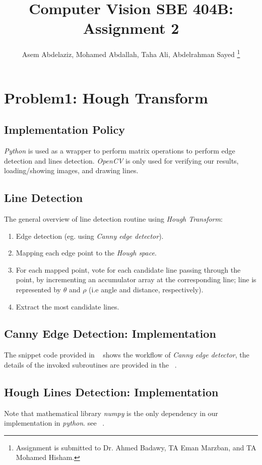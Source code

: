 \documentclass[letterpaper, 12 pt, conference ,onecolumn]{ieeeconf}  %
\title{
Computer Vision SBE 404B: Assignment 2
}
\author{
 Asem Abdelaziz,
 Mohamed Abdallah, 
 Taha Ali,
 Abdelrahman Sayed  
 \thanks{Assignment is submitted to Dr. Ahmed Badawy, TA Eman Marzban, and TA Mohamed Hisham.}
}
\begin{document}
\maketitle



\section{Problem1: Hough Transform}
\subsection*{Implementation Policy}\label{implementation-policy}

\textit{Python} is used as a wrapper to perform matrix operations to perform edge detection and lines detection. \textit{OpenCV} is only used for verifying our results, loading/showing images, and drawing lines.
 
\subsection{Line Detection} 
The general overview of line detection routine using \textit{Hough Transform}:
\begin{enumerate}
\item Edge detection (eg. using \textit{Canny edge detector}).
\item Mapping each edge point to the \textit{Hough space}.
\item For each mapped point, vote for each candidate line passing through the point, by incrementing an accumulator array at the corresponding line; line is represented by $\theta$ and $\rho$ (i.e angle and distance, respectively).
\item Extract the most candidate lines.
\end{enumerate} 

\subsection*{Canny Edge Detection: Implementation}\label{canny-edge-detection}
The snippet code provided in ~ shows the workflow of \textit{Canny edge detector}, the details of the invoked subroutines are provided in the ~.

\subsection*{Hough Lines Detection: Implementation }
Note that mathematical library \textit{numpy} is the only dependency in our implementation in \textit{python}. see ~.
\end{document}
